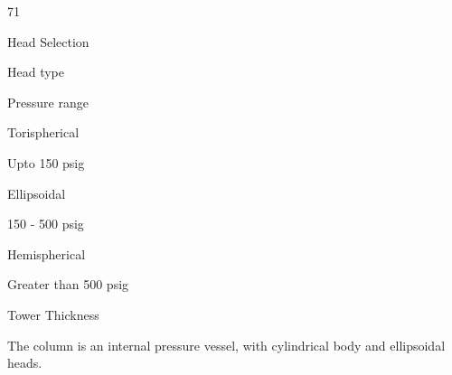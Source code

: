 \documentclass[a4paper,portrait,12pt]{article}
\begin{document}
71





\begin{flushleft}
Head Selection
\end{flushleft}


\begin{flushleft}
Head type
\end{flushleft}





\begin{flushleft}
Pressure range
\end{flushleft}





\begin{flushleft}
Torispherical
\end{flushleft}





\begin{flushleft}
Upto 150 psig
\end{flushleft}





\begin{flushleft}
Ellipsoidal
\end{flushleft}





\begin{flushleft}
150 - 500 psig
\end{flushleft}





\begin{flushleft}
Hemispherical
\end{flushleft}





\begin{flushleft}
Greater than 500 psig
\end{flushleft}





\begin{flushleft}
Tower Thickness
\end{flushleft}





\begin{flushleft}
The column is an internal pressure vessel, with cylindrical body and ellipsoidal heads.
\end{flushleft}
\end{document}
